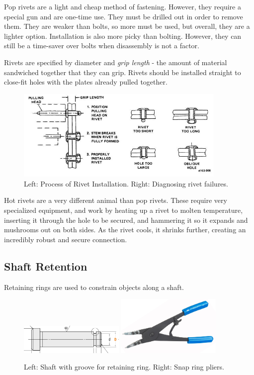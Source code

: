 \documentclass[10pt,letterpaper]{book}
\begin{document}
	Pop rivets are a light and cheap method of fastening. However, they require a special gun and are one-time use. They must be drilled out in order to remove them. They are weaker than bolts, so more must be used, but overall, they are a lighter option. Installation is also more picky than bolting. However, they can still be a time-saver over bolts when disassembly is not a factor.
	
	Rivets are specified by diameter and \textit{grip length} - the amount of material sandwiched together that they can grip. Rivets should be installed straight to close-fit holes with the plates already pulled together.
	
	\begin{figure}[H] \centering
		\includegraphics[width=0.9\textwidth]{imgs/rivet_install.jpeg}
		\caption{Left: Process of Rivet Installation. Right: Diagnosing rivet failures.}
	\end{figure}
	
	Hot rivets are a very different animal than pop rivets. These require very specialized equipment, and work by heating up a rivet to molten temperature, inserting it through the hole to be secured, and hammering it so it expands and mushrooms out on both sides. As the rivet cools, it shrinks further, creating an incredibly robust and secure connection.	
	
	\subsection{Shaft Retention}
	
	Retaining rings are used to constrain objects along a shaft.
	
	\begin{figure}[H]
		\centering
		\includegraphics[width=0.45\textwidth]{imgs/shaft_snapringgroove.png}
		\includegraphics[width=0.45\textwidth]{imgs/snapringtool.jpeg}
		\caption{Left: Shaft with groove for retaining ring. Right: Snap ring pliers.}
	\end{figure}
	
\end{document}
